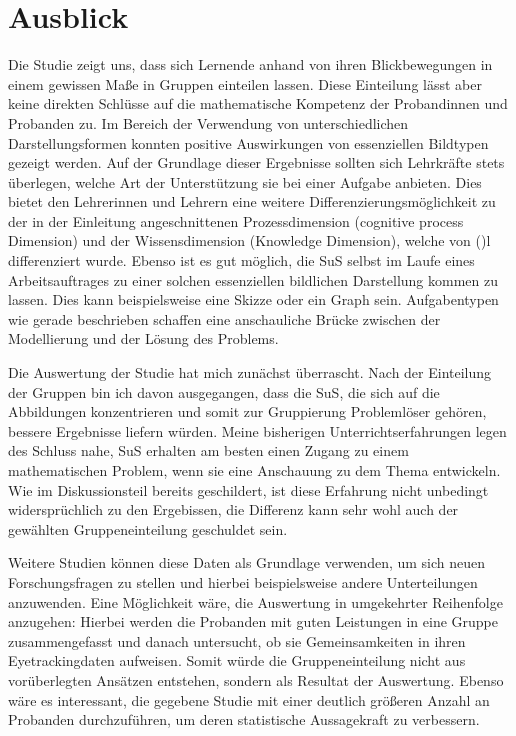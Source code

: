 \chapter{Ausblick}
Die Studie zeigt uns, dass sich Lernende anhand von ihren Blickbewegungen in einem gewissen Maße in Gruppen einteilen lassen. Diese Einteilung lässt aber keine direkten Schlüsse auf die mathematische Kompetenz der Probandinnen und Probanden zu.  Im Bereich der Verwendung von unterschiedlichen Darstellungsformen konnten positive Auswirkungen von essenziellen Bildtypen gezeigt werden.  Auf der Grundlage dieser Ergebnisse sollten sich Lehrkräfte stets überlegen, welche Art der Unterstützung sie bei einer Aufgabe anbieten. Dies bietet den Lehrerinnen und Lehrern eine weitere Differenzierungsmöglichkeit zu der in der Einleitung angeschnittenen Prozessdimension (cognitive process Dimension) und der Wissensdimension (Knowledge Dimension), welche von \citeauthor{anderson2001taxonomy} ()l differenziert wurde. Ebenso ist es gut möglich, die \gls{SuS} selbst im Laufe eines Arbeitsauftrages zu einer solchen essenziellen bildlichen Darstellung kommen zu lassen. Dies kann beispielsweise eine Skizze oder ein Graph sein. Aufgabentypen wie gerade beschrieben schaffen eine anschauliche Brücke zwischen der Modellierung und der Lösung des Problems.


Die Auswertung der Studie hat mich zunächst überrascht. Nach der Einteilung der Gruppen bin ich davon ausgegangen, dass die SuS, die sich auf die Abbildungen konzentrieren und somit zur Gruppierung Problemlöser gehören, bessere Ergebnisse liefern würden. Meine bisherigen Unterrichtserfahrungen legen des Schluss nahe, SuS erhalten am besten einen Zugang zu einem mathematischen Problem, wenn sie eine Anschauung zu dem Thema entwickeln. Wie im Diskussionsteil bereits geschildert, ist diese Erfahrung nicht unbedingt widersprüchlich zu den Ergebissen, die Differenz kann sehr wohl auch der gewählten Gruppeneinteilung geschuldet sein. 


Weitere Studien können diese Daten als Grundlage verwenden, um sich neuen Forschungsfragen zu stellen und hierbei beispielsweise andere Unterteilungen anzuwenden. Eine Möglichkeit wäre, die Auswertung in umgekehrter Reihenfolge anzugehen: Hierbei werden die Probanden mit guten Leistungen in eine Gruppe zusammengefasst und danach untersucht, ob sie Gemeinsamkeiten in ihren Eyetrackingdaten aufweisen. Somit würde die Gruppeneinteilung nicht aus vorüberlegten Ansätzen entstehen, sondern als Resultat der Auswertung. 
Ebenso wäre es interessant, die gegebene Studie mit einer deutlich größeren Anzahl an Probanden durchzuführen, um deren statistische Aussagekraft zu verbessern.